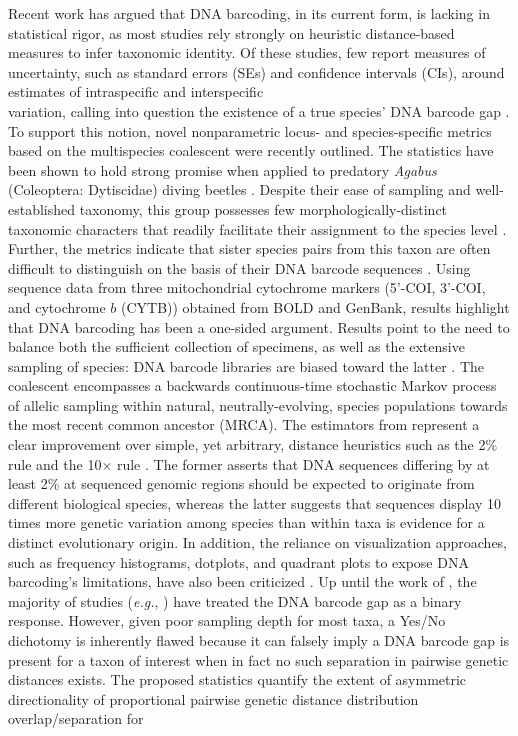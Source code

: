 \documentclass[12pt]{article}
\begin{document}
Recent work has argued that DNA barcoding, in its current form, is lacking in statistical rigor, as most studies rely strongly on heuristic distance-based measures to infer taxonomic identity. Of these studies, few report measures of uncertainty, such as standard errors (SEs) and confidence intervals (CIs), around estimates of intraspecific and interspecific \\ variation, calling into question the existence of a true species' DNA barcode gap \citep{candek2015dna, phillips2022lack}. To support this notion, novel nonparametric locus- and species-specific metrics based on the multispecies coalescent \citep{rannala2003bayes, yang2010bayesian, yang2017bayesian} were recently outlined. The statistics have been shown to hold strong promise when applied to predatory \textit{Agabus} (Coleoptera: Dytiscidae) diving beetles \citep{phillips2024measure}. Despite their ease of sampling and well-established taxonomy, this group possesses few morphologically-distinct taxonomic characters that readily facilitate their assignment to the species level \citep{bergsten2012effect}. Further, the metrics indicate that sister species pairs from this taxon are often difficult to distinguish on the basis of their DNA barcode sequences \citep{phillips2024measure}. Using sequence data from three mitochondrial cytochrome markers (5'-COI, 3'-COI, and cytochrome $b$ (CYTB)) obtained from BOLD and GenBank, results highlight that DNA barcoding has been a one-sided argument. Results point to the need to balance both the sufficient collection of specimens, as well as the extensive sampling of species: DNA barcode libraries are biased toward the latter \citep{phillips2024measure}. The coalescent \citep{kingman1982coalescent, kingman1982genealogy} encompasses a backwards continuous-time stochastic Markov process of allelic sampling within natural, neutrally-evolving, species populations towards the most recent common ancestor (MRCA). The estimators from \citet{phillips2024measure} represent a clear improvement over simple, yet arbitrary, distance heuristics such as the 2\% rule \citep{hebert2003biological} and the 10$\times$ rule \citep{hebert2004identification}. The former asserts that DNA sequences differing by at least 2\% at sequenced genomic regions should be expected to originate from different biological species, whereas the latter suggests that sequences display 10 times more genetic variation among species than within taxa is evidence for a distinct evolutionary origin. In addition, the reliance on visualization approaches, such as frequency histograms, dotplots, and quadrant plots to expose DNA barcoding's limitations, have also been criticized \citep{collins2013seven, phillips2022lack}. Up until the work of \cite{phillips2024measure}, the majority of studies (\textit{e.g.}, \citet{young2021macer}) have treated the DNA barcode gap as a binary response. However, given poor sampling depth for most taxa, a Yes/No dichotomy is inherently flawed because it can falsely imply a DNA barcode gap is present for a taxon of interest when in fact no such separation in pairwise genetic distances exists. The proposed statistics quantify the extent of asymmetric directionality of proportional pairwise genetic distance distribution overlap/separation for 
\end{document}
